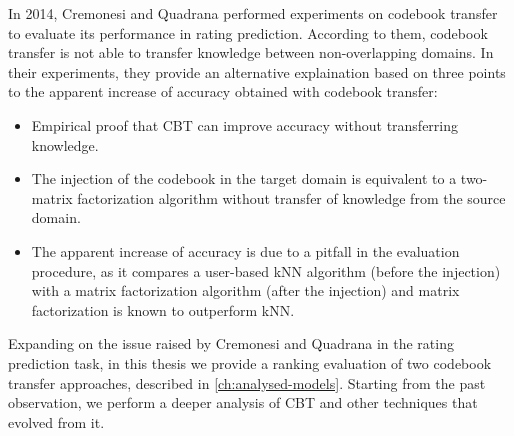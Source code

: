In 2014, Cremonesi and Quadrana \cite{10.1145/2645710.2645769} performed experiments on codebook transfer to evaluate its performance in rating prediction. According to them, codebook transfer is not able to transfer knowledge between non-overlapping domains. In their experiments, they provide an alternative explaination based on three points to the apparent increase of accuracy obtained with codebook transfer:
\begin{itemize}
\item Empirical proof that CBT can improve accuracy without transferring knowledge.
\item The injection of the codebook in the target domain is equivalent to a two-matrix factorization algorithm without transfer of knowledge from the source domain.
\item The apparent increase of accuracy is due to a pitfall in the evaluation procedure, as it compares a user-based kNN algorithm (before the injection) with a matrix factorization algorithm (after the injection) and matrix factorization is known to outperform kNN.
\end{itemize}
Expanding on the issue raised by Cremonesi and Quadrana in the rating prediction task, in this thesis we provide a ranking evaluation of two codebook transfer approaches, described in \autoref{ch:analysed-models}. Starting from the past observation, we perform a deeper analysis of CBT and other techniques that evolved from it.